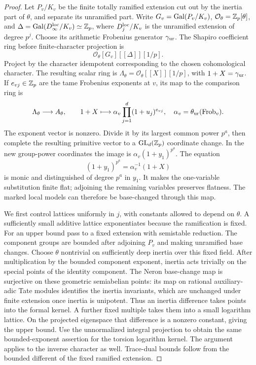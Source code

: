 \begin{proof}
Let \(P_v/K_v\) be the finite totally ramified extension cut out by
the inertia part of \(\theta\), and separate its unramified part.
Write \(G_v=\operatorname{Gal}(P_v/K_v)\),
\(\mathcal O_\theta=\mathbb Z_p[\theta]\), and
\(\Delta=\operatorname{Gal}(D_\infty^{\rm loc}/K_v)\simeq\mathbb Z_p\), where
\(D_j^{\rm loc}/K_v\) is the unramified extension of degree \(p^j\).
Choose its arithmetic Frobenius generator \(\gamma_{\rm ur}\).
The Shapiro coefficient ring before finite-character projection is
\[
 \mathcal O_\theta[G_v][[\Delta]][1/p].
\]
Project by the character idempotent corresponding to the chosen
cohomological character.  The resulting scalar ring is
\(\Lambda_\theta=\mathcal O_\theta[[X]][1/p]\), with
\(1+X=\gamma_{\rm ur}\).
If \(e_{vj}\in\mathbb Z_p\) are the tame Frobenius exponents at \(v\), its
map to the comparison ring is
\[
 \Lambda_\theta\longrightarrow A_\theta,\qquad
 1+X\longmapsto
 \alpha_v\prod_{j=1}^d(1+u_j)^{e_{vj}},
 \quad \alpha_v=\theta_{\rm ur}(\operatorname{Frob}_v).
\]
The exponent vector is nonzero.  Divide it by its largest common
power \(p^a\), then complete the resulting primitive vector to a
\(\mathrm{GL}_d(\mathbb Z_p)\) coordinate change.  In the new group-power
coordinates the image is \(\alpha_v(1+y_1)^{p^a}\).
The equation
\[
 (1+y_1)^{p^a}=\alpha_v^{-1}(1+X)
\]
is monic and distinguished of degree \(p^a\) in \(y_1\).
It makes the one-variable substitution finite flat; adjoining the
remaining variables preserves flatness.  The marked local models
can therefore be base-changed through this map.

We first control lattices uniformly in \(j\), with constants allowed
to depend on \(\theta\).  A sufficiently small additive lattice
exponentiates because the ramification is fixed.  For an upper bound
pass to a fixed extension with semistable reduction.  The component
groups are bounded after adjoining \(P_v\) and making unramified
base changes.  Choose \(\theta\) nontrivial on sufficiently deep
inertia over this fixed field.  After multiplication by the bounded
component exponent, inertia acts trivially on the special points of
the identity component.  The Neron base-change map is surjective
on these geometric semiabelian points: its map on rational
auxiliary-adic Tate modules identifies the inertia invariants,
which are unchanged under finite extension once inertia is
unipotent.  Thus an inertia difference takes points into the formal
kernel.  A further fixed multiple takes them into a small logarithm
lattice.  On the projected eigenspace that difference is a nonzero
constant, giving the upper bound.  Use the unnormalized integral
projection to obtain the same bounded-exponent assertion for the
torsion logarithm kernel.  The argument applies to the inverse
character as well.  Trace-dual bounds follow from the bounded
different of the fixed ramified extension.


\end{proof}
